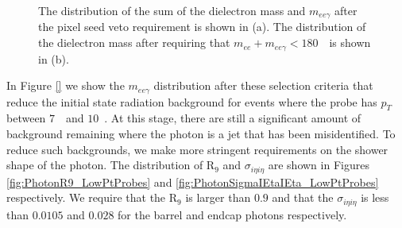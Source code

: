 \documentclass{cmspaper}
\begin{document}
\begin{figure}[htb]
  \begin{center}
    \caption{ The distribution of the sum of the dielectron mass and $m_{ee\gamma}$ after the pixel seed veto
      requirement is shown in (a). The distribution of the dielectron mass after requiring that $m_{ee} + m_{ee\gamma} < 180$~\GeV\
      is shown in (b). 
    }
    \label{fig:ISRRemoval}
  \end{center}
\end{figure}

In Figure \ref{} we show the $m_{ee\gamma}$ distribution after these selection criteria 
that reduce the initial state radiation background for events where the probe has $p_{T}$ 
between $7$~\GeV\ and $10$~\GeV. At this stage, there are still a significant amount
of background remaining where the photon is a jet that has been misidentified. To reduce 
such backgrounds, we make more stringent requirements on the shower shape of the photon.
The distribution of $\mathrm{R}_{9}$ and $\sigma_{i\eta i\eta}$ are shown in 
Figures \ref{fig:PhotonR9_LowPtProbes} and \ref{fig:PhotonSigmaIEtaIEta_LowPtProbes} respectively. 
We require that the $\mathrm{R}_{9}$ is
larger than $0.9$ and that the $\sigma_{i\eta i\eta}$ is less than $0.0105$ and $0.028$ for
the barrel and endcap photons respectively. 
\end{document}
